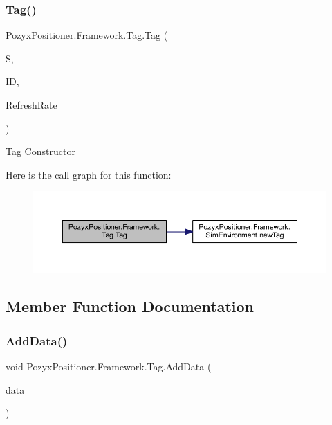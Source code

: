 \subsubsection{\texorpdfstring{Tag()}{Tag()}}
{\footnotesize\ttfamily Pozyx\+Positioner.\+Framework.\+Tag.\+Tag (\begin{DoxyParamCaption}\item[{\hyperlink{class_pozyx_positioner_1_1_framework_1_1_sim_environment}{Sim\+Environment}}]{S,  }\item[{string}]{ID,  }\item[{int}]{Refresh\+Rate }\end{DoxyParamCaption})}



\hyperlink{class_pozyx_positioner_1_1_framework_1_1_tag}{Tag} Constructor 

Here is the call graph for this function\+:
\nopagebreak
\begin{figure}[H]
\begin{center}
\leavevmode
\includegraphics[width=350pt]{class_pozyx_positioner_1_1_framework_1_1_tag_a6d2e7bd4c11d5f5f32cc57c38b343542_cgraph}
\end{center}
\end{figure}


\subsection{Member Function Documentation}
\mbox{\label{class_pozyx_positioner_1_1_framework_1_1_tag_ac2741e137c420ad71f64ee2d3d5fefe8}} 
\subsubsection{\texorpdfstring{Add\+Data()}{AddData()}}
{\footnotesize\ttfamily void Pozyx\+Positioner.\+Framework.\+Tag.\+Add\+Data (\begin{DoxyParamCaption}\item[{\hyperlink{struct_pozyx_positioner_1_1_framework_1_1_pos_data}{Pos\+Data}}]{data }\end{DoxyParamCaption})}



